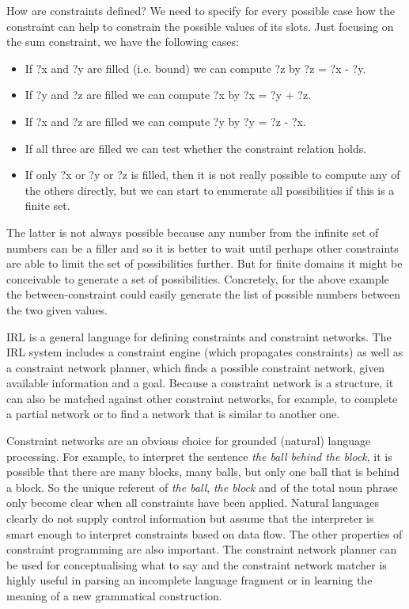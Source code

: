 How are constraints defined? We need to specify for every possible case how the constraint can help to 
constrain the possible values of its slots. 
Just focusing on the sum constraint, we have the following cases:
\begin{itemize}
\item If ?x and ?y are filled (i.e. bound) 
we can compute ?z by ?z = ?x - ?y. 
\item If ?y and ?z are filled we can compute ?x by ?x = ?y + ?z. 
\item If ?x and ?z are filled we can compute ?y by ?y = ?z - ?x. 
\item If all three are filled we can test whether the constraint relation holds. 
\item If only ?x or ?y or ?z is filled, then it is not really possible to compute any of the others directly, but we can start 
to enumerate all possibilities if this is a finite set. 
\end{itemize}
The latter is not always possible because any number from the infinite set of numbers can be a filler 
and so it is better to wait until 
perhaps other constraints are able to limit the set of possibilities further. But for finite domains 
it might be conceivable to generate a set of possibilities. Concretely, for the above example  
the between-constraint could easily generate the list of possible numbers between the two given values.

IRL is a general language for defining constraints and constraint networks. The IRL system includes a 
constraint engine (which propagates constraints) as well as a constraint network planner, which finds a possible 
constraint network, given available information and a goal. Because a constraint network is a structure, it 
can also be matched against other constraint networks, for example, to complete a partial network or to find a network 
that is similar to another one. 

Constraint networks are an obvious choice for grounded (natural) language processing. 
For example, to interpret the sentence \textit{the ball behind
the block}, it is possible that there are many blocks, many balls, but only one ball that is behind a block. So the 
unique referent of \textit{the ball}, \textit{the block} and of the total noun phrase only become clear when 
all constraints have been applied. Natural languages clearly do not supply control information but assume that 
the interpreter is smart enough to interpret constraints based on data flow. The other properties of constraint 
programming are also important. The constraint network planner can be used for conceptualising what to say and 
the constraint network matcher is highly useful in parsing an incomplete language fragment or in learning the 
meaning of a new grammatical construction.

